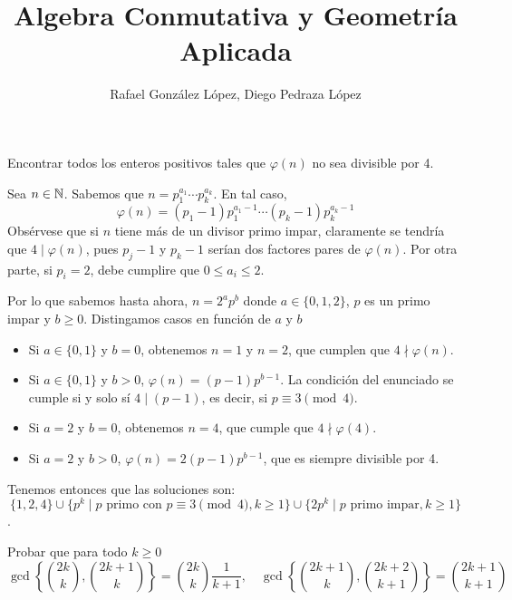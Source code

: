 \documentclass[twoside]{article}
\begin{document}
\title{Algebra Conmutativa y Geometría Aplicada}
\author{Rafael González López, Diego Pedraza López}
\maketitle

\begin{ejercicio}{1}
Encontrar todos los enteros positivos tales que $\varphi(n)$ no sea divisible por 4.
\begin{sol}
Sea $n\in \mathbb{N}$. Sabemos que $n=p_1^{a_1}\cdots p_k^{a_k}$. En tal caso, 
\[
\varphi(n) = (p_1-1)p_1^{a_1-1}\cdots(p_k-1)p_k^{a_k-1}
\]
Obsérvese que si $n$ tiene más de un divisor primo impar, claramente se tendría que $4\mid \varphi(n)$, pues $p_j -1$ y $p_k-1$ serían dos factores pares de $\varphi(n)$. Por otra parte, si $p_i=2$, debe cumplire que $0\leq a_i \leq 2$. 

Por lo que sabemos hasta ahora, $n = 2^a p^b$ donde $a\in\{0,1,2\}$, $p$ es un primo impar y $b\geq 0$. Distingamos casos en función de $a$ y $b$
\begin{itemize}
\item Si $a \in \{0,1\}$ y $b = 0$, obtenemos $n=1$ y $n=2$, que cumplen que $4 \nmid φ(n)$.
\item Si $a \in \{0,1\}$ y $b > 0$, $\varphi(n) = (p-1)p^{b-1}$. La condición del enunciado se cumple si y solo sí $4 \mid (p-1)$, es decir, si $p \equiv 3 \pmod 4$.
\item Si $a=2$ y $b = 0$, obtenemos $n=4$, que cumple que $4 \nmid φ(4)$.
\item Si $a=2$ y $b > 0$, $\varphi(n)=2(p-1)p^{b-1}$, que es siempre divisible por 4.
\end{itemize}
Tenemos entonces que las soluciones son:
\[ \{1,2,4\} \cup \{p^k \mid p\text{ primo con } p \equiv 3 \pmod 4, k≥1\} \cup \{2p^k \mid p\text{ primo impar}, k ≥ 1\} \].
\end{sol}
\end{ejercicio}

\newpage


\begin{ejercicio}{2}
Probar que para todo $k\geq 0$
\[
\gcd \left\{\binom{2k}{k},\binom{2k+1}{k}\right\}=\binom{2k}{k}\frac{1}{k+1}, \quad \gcd \left\{\binom{2k+1}{k},\binom{2k+2}{k+1}\right\}=\binom{2k+1}{k+1}
\]
\begin{sol}
\end{sol}
\end{ejercicio}


\newpage
\end{document}
